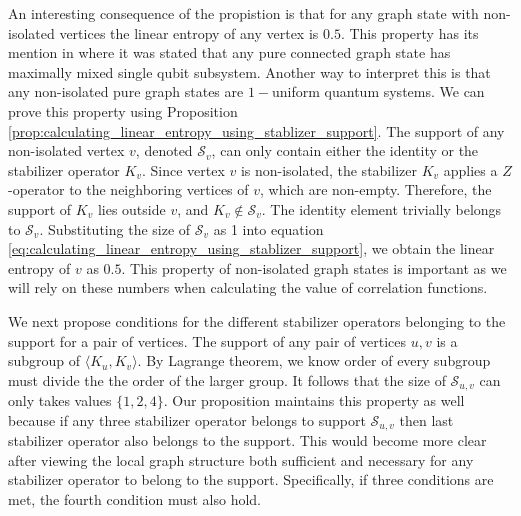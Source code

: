 \documentclass{article}
\begin{document}
An interesting consequence of the propistion is that for any graph state with non-isolated vertices the linear entropy of any vertex is $0.5$. This property has its mention in \cite{hein2006entanglement} where it was stated that any pure connected graph state has maximally mixed single qubit subsystem. Another way to interpret this is that any non-isolated pure graph states are $1-$uniform quantum systems. We can prove this property using Proposition \ref{prop:calculating_linear_entropy_using_stablizer_support}. The support of any non-isolated vertex $v$, denoted $\mathcal{S}_v$, can only contain either the identity or the stabilizer operator $K_v$. Since vertex $v$ is non-isolated, the stabilizer $K_v$ applies a $Z$-operator to the neighboring vertices of $v$, which are non-empty. Therefore, the support of $K_v$ lies outside $v$, and $K_v \notin \mathcal{S}_v$. The identity element trivially belongs to $\mathcal{S}_v$. Substituting the size of $\mathcal{S}_v$ as 1 into equation \ref{eq:calculating_linear_entropy_using_stablizer_support}, we obtain the linear entropy of $v$ as $0.5$. This property of non-isolated graph states is important as we will rely on these numbers when calculating the value of correlation functions. 

We next propose conditions for the different stabilizer operators belonging to the support for a pair of vertices. The support of any pair of vertices $u, v$ is a subgroup of $\langle K_u, K_v\rangle$. By Lagrange theorem, we know  order of every subgroup must divide the the order of the larger group. It follows that the size of $\mathcal{S}_{u, v}$ can only takes values $\{ 1,2,4\}$. Our proposition maintains this property as well because if any three stabilizer operator belongs to support $\mathcal{S}_{u, v}$ then last stabilizer operator also belongs to the support. This would become more clear after viewing the local graph structure both sufficient and necessary for any stabilizer operator to belong to the support. Specifically, if three conditions are met, the fourth condition must also hold.
\end{document}
